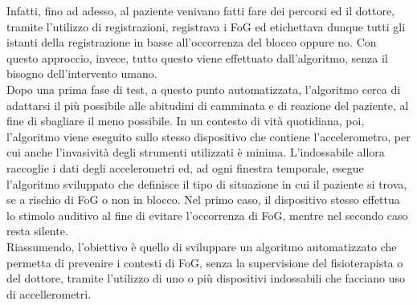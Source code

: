 Infatti, fino ad adesso, al paziente venivano fatti fare dei percorsi ed il dottore, tramite l'utilizzo di registrazioni, registrava i FoG ed etichettava dunque tutti gli istanti della registrazione in basse all'occorrenza del blocco oppure no. Con questo approccio, invece, tutto questo viene effettuato dall'algoritmo, senza il bisogno dell'intervento umano.\\
Dopo una prima fase di test, a questo punto automatizzata, l'algoritmo cerca di adattarsi il più possibile alle abitudini di camminata e di reazione del paziente, al fine di sbagliare il meno possibile. In un contesto di vità quotidiana, poi, l'algoritmo viene eseguito sullo stesso dispositivo che contiene l'accelerometro, per cui anche l'invasività degli strumenti utilizzati è minima. L'indossabile allora raccoglie i dati degli accelerometri ed, ad ogni finestra temporale, esegue l'algoritmo sviluppato che definisce il tipo di situazione in cui il paziente si trova, se a rischio di FoG o non in blocco. Nel primo caso, il dispositivo stesso effettua lo stimolo auditivo al fine di evitare l'occorrenza di FoG, mentre nel secondo caso resta silente.\\
Riassumendo, l'obiettivo è quello di sviluppare un algoritmo automatizzato che permetta di prevenire i contesti di FoG, senza la supervisione del fisioterapista o del dottore, tramite l'utilizzo di uno o più dispositivi indossabili che facciano uso di accellerometri.
